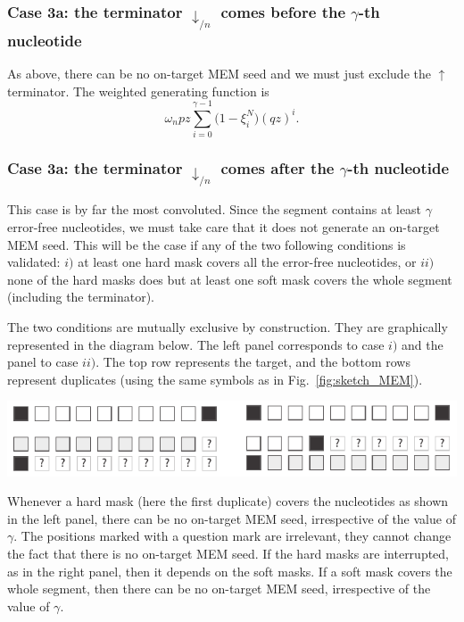 \documentclass{article}
\newenvironment{inset}
{\vspace{0.5\baselineskip}\begin{center}}
{\end{center}\vspace{0.5\baselineskip}}
\begin{document}
\subsubsection*{Case 3a: the terminator $\downarrow_{/n}$ comes before the
$\gamma$-th nucleotide}

As above, there can be no on-target MEM seed and we must just exclude the
$\uparrow$ terminator. The weighted generating function is
\begin{equation}
\omega_n pz \sum_{i=0}^{\gamma-1} \Big(1 - \xi_i^N \Big) (qz)^i.
\end{equation}

\subsubsection*{Case 3a: the terminator $\downarrow_{/n}$ comes after the
$\gamma$-th nucleotide}

This case is by far the most convoluted. Since the segment contains at
least $\gamma$ error-free nucleotides, we must take care that it does not
generate an on-target MEM seed. This will be the case if any of the two
following conditions is validated: $i)$ at least one hard mask covers all
the error-free nucleotides, or $ii)$ none of the hard masks does but at
least one soft mask covers the whole segment (including the terminator).

The two conditions are mutually exclusive by construction. They are
graphically represented in the diagram below. The left panel corresponds
to case $i)$ and the panel to case $ii)$. The top row represents the
target, and the bottom rows represent duplicates (using the same
symbols as in Fig.~\ref{fig:sketch_MEM}).
\begin{inset}
\includegraphics{masks.pdf}
\end{inset}

Whenever a hard mask (here the first duplicate) covers the nucleotides
as shown in the left panel, there can be no on-target MEM seed,
irrespective of the value of $\gamma$. The positions marked with a
question mark are irrelevant, they cannot change the fact that there is no
on-target MEM seed. If the hard masks are interrupted, as in the right
panel, then it depends on the soft masks. If a soft mask covers the whole
segment, then there can be no on-target MEM seed, irrespective of the
value of $\gamma$.
\end{document}
